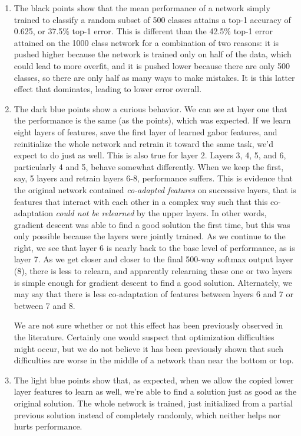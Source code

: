 \begin{enumerate}

\item The black  points show that the mean performance of a network simply trained to classify a random subset of 500 classes attains a top-1 accuracy of 0.625, or 37.5\% top-1 error. This is different than the 42.5\% top-1 error attained on the 1000 class network for a combination of two reasons: it is pushed higher because the network is trained only on half of the data, which could lead to more overfit, and it is pushed lower because there are only 500 classes, so there are only half as many ways to make mistakes. It is this latter effect that dominates, leading to lower error overall.

\item The dark blue  points show a curious behavior. We can see at layer one that the performance is the same (as the  points), which was expected. If we learn eight layers of features, save the first layer of learned gabor features, and reinitialize the whole network and retrain it toward the same task, we'd expect to do just as well. This is also true for layer 2. Layers 3, 4, 5, and 6, particularly 4 and 5, behave somewhat differently. When we keep the first, say, 5 layers and retrain layers 6-8, performance suffers. This is evidence that the original network contained \emph{co-adapted features} on successive layers, that is features that interact with each other in a complex way such that this co-adaptation \emph{could not be relearned} by the upper layers. In other words, gradient descent was able to find a good solution the first time, but this was only possible because the layers were jointly trained. As we continue to the right, we see that layer 6 is nearly back to the base level of performance, as is layer 7. As we get closer and closer to the final 500-way softmax output layer (8), there is less to relearn, and apparently relearning these one or two layers is simple enough for gradient descent to find a good solution. Alternately, we may say that there is less co-adaptation of features between layers 6 and 7 or between 7 and 8.

We are not sure whether or not this effect has been previously observed in the literature. Certainly one would suspect that optimization difficulties might occur, but we do not believe it has been previously shown that such difficulties are worse in the middle of a network than near the bottom or top.

\item The light blue  points show that, as expected, when we allow the copied lower layer features to learn as well, we're able to find a solution just as good as the original solution. The whole network is trained, just initialized from a partial previous solution instead of completely randomly, which neither helps nor hurts performance.


\end{enumerate}

